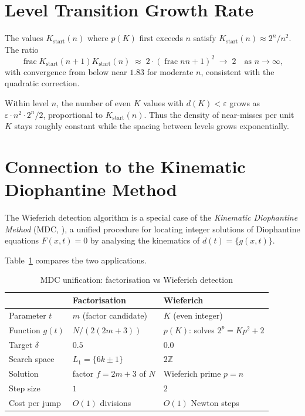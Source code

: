 \documentclass[12pt,a4paper]{article}
\theoremstyle{definition}
\theoremstyle{remark}
\newcommand{\frac}{\operatorname{frac}}   %
\newcommand{\Z}{\mathbb{Z}}
\begin{document}
\section{Level Transition Growth Rate}
\label{sec:growth}

The values $K_{\mathrm{start}}(n)$ where $p(K)$ first exceeds $n$ satisfy
$K_{\mathrm{start}}(n) \approx 2^n/n^2$. The ratio
\[
  \frac{K_{\mathrm{start}}(n+1)}{K_{\mathrm{start}}(n)}
  \;\approx\;
  2\cdot\left(\frac{n}{n+1}\right)^2 \;\longrightarrow\; 2
  \quad\text{as } n\to\infty,
\]
with convergence from below near $1.83$ for moderate $n$, consistent
with the quadratic correction.

Within level $n$, the number of even $K$ values with $d(K) < \varepsilon$
grows as $\varepsilon \cdot n^2 \cdot 2^n/2$, proportional to
$K_{\mathrm{start}}(n)$. Thus the density of near-misses per unit $K$
stays roughly constant while the spacing between levels grows
exponentially.

\section{Connection to the Kinematic Diophantine Method}
\label{sec:mdc}

The Wieferich detection algorithm is a special case of the
\emph{Kinematic Diophantine Method} (MDC, \cite{VMA2026MDC}), a unified
procedure for locating integer solutions of Diophantine equations
$F(x,t)=0$ by analysing the kinematics of $d(t) = \{g(x,t)\}$.

Table~\ref{tab:mdc} compares the two applications.

\begin{table}[h]
\centering
\caption{MDC unification: factorisation vs Wieferich detection}
\label{tab:mdc}
\begin{tabular}{@{}lll@{}}
\toprule
& \textbf{Factorisation} & \textbf{Wieferich} \\
\midrule
Parameter $t$      & $m$ (factor candidate)     & $K$ (even integer) \\
Function $g(t)$    & $N/(2(2m+3))$              & $p(K)$: solves $2^p=Kp^2+2$ \\
Target $\delta$    & $0.5$                      & $0.0$ \\
Search space       & $L_1 = \{6k\pm 1\}$        & $2\Z$ \\
Solution           & factor $f = 2m+3$ of $N$   & Wieferich prime $p = n$ \\
Step size          & $1$                        & $2$ \\
Cost per jump      & $O(1)$ divisions           & $O(1)$ Newton steps \\
\bottomrule
\end{tabular}
\end{table}
\end{document}
